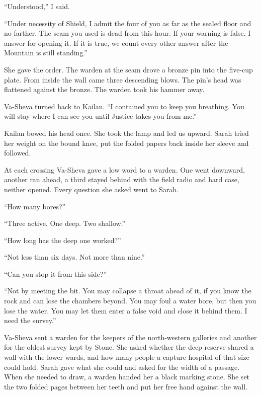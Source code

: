 ``Understood,'' I said.\par

``Under necessity of Shield, I admit the four of you as far as the sealed floor and no farther. The seam you used is dead from this hour. If your warning is false, I answer for opening it. If it is true, we count every other answer after the Mountain is still standing.''\par

She gave the order. The warden at the seam drove a bronze pin into the five-cup plate. From inside the wall came three descending blows. The pin's head was flattened against the bronze. The warden took his hammer away.\par

Va-Sheva turned back to Kailan. ``I contained you to keep you breathing. You will stay where I can see you until Justice takes you from me.''\par

Kailan bowed his head once. She took the lamp and led us upward. Sarah tried her weight on the bound knee, put the folded papers back inside her sleeve and followed.\par

At each crossing Va-Sheva gave a low word to a warden. One went downward, another ran ahead, a third stayed behind with the field radio and hard case, neither opened. Every question she asked went to Sarah.\par

``How many bores?''\par

``Three active. One deep. Two shallow.''\par

``How long has the deep one worked?''\par

``Not less than six days. Not more than nine.''\par

``Can you stop it from this side?''\par

``Not by meeting the bit. You may collapse a throat ahead of it, if you know the rock and can lose the chambers beyond. You may foul a water bore, but then you lose the water. You may let them enter a false void and close it behind them. I need the survey.''\par

Va-Sheva sent a warden for the keepers of the north-western galleries and another for the oldest survey kept by Stone. She asked whether the deep reserve shared a wall with the lower wards, and how many people a capture hospital of that size could hold. Sarah gave what she could and asked for the width of a passage. When she needed to draw, a warden handed her a black marking stone. She set the two folded pages between her teeth and put her free hand against the wall.\par

